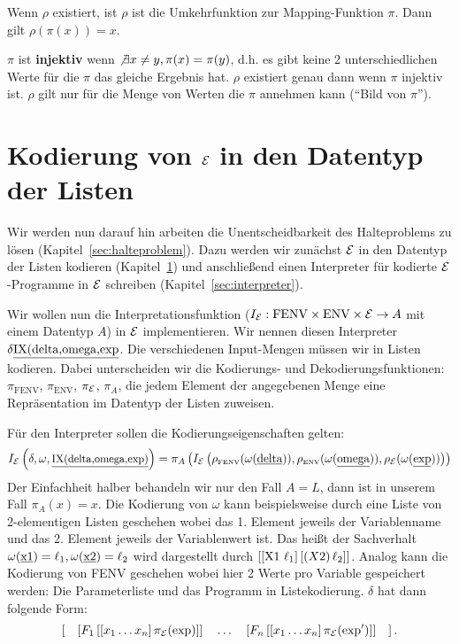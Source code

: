 \begin{defn}
Wenn $\rho$ existiert, ist $\rho$ ist die Umkehrfunktion zur Mapping-Funktion $\pi$.
Dann gilt $\rho(\pi(x))=x$.
\end{defn}
$\pi$ ist \textbf{injektiv} wenn $\not \exists x \neq y, \pi(x)=\pi(y)$, d.h.
es gibt keine 2 unterschiedlichen Werte für die $\pi$ das gleiche Ergebnis hat.
$\rho$ existiert genau dann wenn $\pi$ injektiv ist.
$\rho$ gilt nur für die Menge von Werten die $\pi$ annehmen kann (``Bild von $\pi$'').

\section{Kodierung von $\mathcal{E}$ in den Datentyp der Listen}\label{sec:codingE}
Wir werden nun darauf hin arbeiten die Unentscheidbarkeit des Halteproblems zu lösen (Kapitel~\ref{sec:halteproblem}).
Dazu werden wir zunächst $\mathcal{E}$ in den Datentyp der Listen kodieren (Kapitel~\ref{sec:codingE}) und anschließend einen Interpreter für
kodierte $\mathcal{E}$-Programme in $\mathcal{E}$ schreiben (Kapitel~\ref{sec:interpreter}).

Wir wollen nun die Interpretationsfunktion ($I_{\mathcal{E}}: \text{FENV} \times \text{ENV} \times \mathcal{E} \to A$ mit einem Datentyp $A$) in $\mathcal{E}$ implementieren.
Wir nennen diesen Interpreter $\delta\text{\underline{IX(delta,omega,exp}}$.
Die verschiedenen Input-Mengen müssen wir in Listen kodieren. Dabei unterscheiden wir die Kodierungs- und
Dekodierungsfunktionen: $\pi_{\text{FENV}}$, $\pi_{\text{ENV}}$, $\pi_{\mathcal{E}}$, $\pi_{A}$, die jedem Element der angegebenen Menge eine
Repräsentation im Datentyp der Listen zuweisen.

Für den Interpreter sollen die Kodierungseigenschaften gelten:
\[I_{\mathcal{E}}\left(\delta,\omega,\text{\underline{\small IX(delta,omega,exp)}}\right)=\pi_{A}\left(I_{\mathcal{E}}\left(\rho_{\text{\tiny FENV}}(\omega(\text{\underline{delta}})),\rho_{\text{\tiny ENV}}(\omega(\text{\underline{omega}})),\rho_{\mathcal{E}}(\omega(\text{\underline{exp}}))\right)\right)\]
Der Einfachheit halber behandeln wir nur den Fall $A=L$, dann ist in unserem Fall $\pi_{A}(x)=x$.
Die Kodierung von $\omega$ kann beispielsweise durch eine Liste von 2-elementigen Listen geschehen wobei das 1. Element jeweils der Variablenname
und das 2. Element jeweils der Variablenwert ist. Das heißt der Sachverhalt $\omega(\text{\underline{x1}})=\ell_1, \omega(\text{\underline{x2}})=\ell_2$ wird dargestellt durch
$\left[ \left[\text{X1 } \ell_1\right] \left[\left(X2 \right) \ell_2\right] \right]$. Analog kann die Kodierung von FENV geschehen wobei hier 2 Werte pro Variable gespeichert werden: Die Parameterliste und das Programm in Listekodierung.
$\delta$ hat dann folgende Form: 
\[\left[\quad\left[F_1 \left[ \left[x_1 \ldots x_n\right] \pi_{\mathcal{E}}(\text{exp})\right]\right] \quad \ldots \quad \left[F_n \left[ \left[x_1 \ldots x_n\right] \pi_{\mathcal{E}}(\text{exp}')\right]\right]\quad\right].\]

